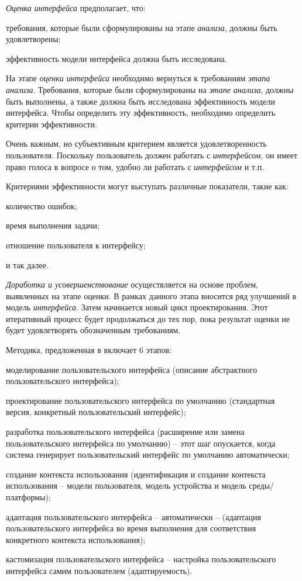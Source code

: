 \textit{Оценка интерфейса} предполагает, что:
\begin{textitemize}
	\item требования, которые были сформулированы на этапе \textit{анализа}, должны быть удовлетворены;
	\item эффективность модели интерфейса должна быть исследована.
\end{textitemize}

На этапе \textit{оценки интерфейса} необходимо вернуться к требованиям \textit{этапа анализа}. Требования, которые были сформулированы на \textit{этапе анализа}, должны быть выполнены, а также должна быть исследована эффективность модели интерфейса.
Чтобы определить эту эффективность, необходимо определить критерии эффективности.

Очень важным, но субъективным критерием является удовлетворенность пользователя. Поскольку пользователь должен работать с \textit{интерфейсом}, он имеет право голоса в вопросе о том, удобно ли работать с \textit{интерфейсом} и т.п.

Критериями эффективности могут выступать различные показатели, такие как:
\begin{textitemize}
	\item количество ошибок;
	\item время выполнения задачи;
	\item отношение пользователя к интерфейсу;
	\item и так далее.
\end{textitemize}

\textit{Доработка и усовершенствование} осуществляется на основе проблем, выявленных на этапе оценки. В рамках данного этапа вносится ряд улучшений в модель \textit{интерфейса}. Затем начинается новый цикл проектирования. Этот итеративный процесс будет продолжаться до тех пор, пока результат оценки не будет удовлетворять обозначенным требованиям. 

Методика, предложенная в  включает 6 этапов:
\begin{textitemize}
	\item моделирование пользовательского интерфейса (описание абстрактного пользовательского интерфейса);
	\item проектирование пользовательского интерфейса по умолчанию (стандартная версия, конкретный пользовательский интерфейс);
	\item разработка пользовательского интерфейса (расширение или замена пользовательского интерфейса по умолчанию) -- этот шаг опускается, когда система генерирует пользовательский интерфейс по умолчанию автоматически;
	\item создание контекста использования (идентификация и создание контекста использования -- модели пользователя, модель устройства и модель среды/платформы);
	\item адаптация пользовательского интерфейса -- автоматически -- (адаптация пользовательского интерфейса во время выполнения для соответствия конкретного контекста использования);
	\item кастомизация пользовательского интерфейса -- настройка пользовательского интерфейса самим пользователем (адаптируемость).
\end{textitemize}

